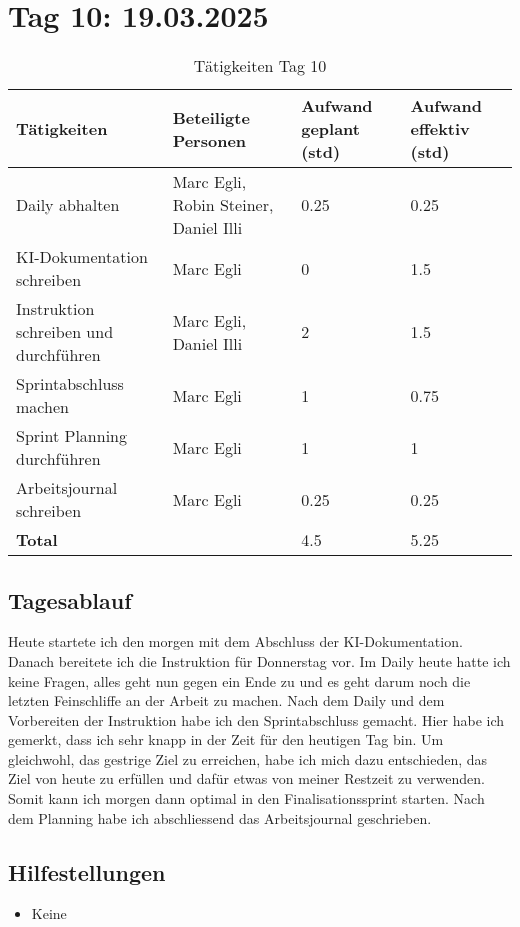 \section{Tag 10: 19.03.2025}
\begin{table}[H]
    \begin{tabular}{|L{0.4\textwidth}|C{60pt}|C{60pt}|C{60pt}|}
        \hline
        \color{white}Tätigkeiten & \color{white}Beteiligte \color{white}Personen & \color{white}Aufwand geplant (std) & \color{white}Aufwand effektiv (std) \\
        \hline
        Daily abhalten  & Marc Egli, Robin Steiner, Daniel Illi & 0.25 & 0.25 \\ 
        \hline
        KI-Dokumentation schreiben & Marc Egli & 0 & 1.5 \\
        \hline
        Instruktion schreiben und durchführen & Marc Egli, Daniel Illi & 2 & 1.5 \\
        \hline
        Sprintabschluss machen & Marc Egli & 1 & 0.75 \\
        \hline
        Sprint Planning durchführen & Marc Egli & 1 & 1 \\
        \hline
        Arbeitsjournal schreiben & Marc Egli & 0.25 & 0.25 \\
        \hline
        \textbf{Total} &  & 4.5 &  5.25 \\
        \hline
    \end{tabular}
    \caption{Tätigkeiten Tag 10}
\end{table}

\subsection*{Tagesablauf}
Heute startete ich den morgen mit dem Abschluss der KI-Dokumentation. Danach bereitete ich die Instruktion für Donnerstag vor.
Im Daily heute hatte ich keine Fragen, alles geht nun gegen ein Ende zu und es geht darum noch die letzten Feinschliffe an der Arbeit 
zu machen.
Nach dem Daily und dem Vorbereiten der Instruktion habe ich den Sprintabschluss gemacht. Hier habe ich gemerkt, dass ich sehr knapp in der Zeit für den
heutigen Tag bin. Um gleichwohl, das gestrige Ziel zu erreichen, habe ich mich dazu entschieden, das Ziel von heute zu erfüllen und dafür etwas von meiner
Restzeit zu verwenden. Somit kann ich morgen dann optimal in den Finalisationssprint starten. Nach dem Planning habe ich 
abschliessend das Arbeitsjournal geschrieben. 

\subsection*{Hilfestellungen}
\begin{itemize}
    \item Keine
\end{itemize}

